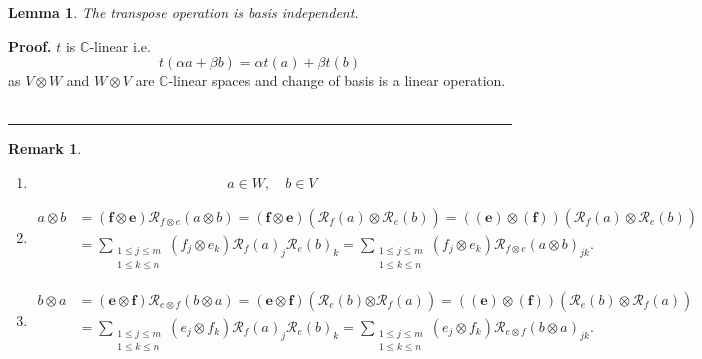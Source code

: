 \documentclass[aps,preprint]{revtex4}%
\newtheorem{lemma}[theorem]{Lemma}
\newtheorem{remark}[theorem]{Remark}
\newenvironment{proof}[1][Proof]{\noindent\textbf{#1.} }{\ \rule{0.5em}{0.5em}}
\begin{document}
\begin{lemma}
The transpose operation is basis independent.
\end{lemma}

\begin{proof}
$t$ is $\mathbb{C}$-linear i.e.
\begin{equation}
t\left(  \alpha a+\beta b\right)  =\alpha t\left(  a\right)  +\beta t\left(
b\right)
\end{equation}
as $V\otimes W$ and $W\otimes V$ are $\mathbb{C}$-linear spaces and change of
basis is a linear operation.
\end{proof}

\begin{remark}
\begin{enumerate}
\item
\begin{equation}
a\in W,\quad b\in V
\end{equation}


\item
\begin{align}
a\otimes b  &  =\left(  \boldsymbol{f}\otimes\boldsymbol{e}\right)
\mathcal{R}_{f\otimes e}\left(  a\otimes b\right)  =\left(  \boldsymbol{f}%
\otimes\boldsymbol{e}\right)  \left(  \overset{}{\mathcal{R}_{f}\left(
a\right)  \otimes\mathcal{R}_{e}\left(  b\right)  }\right)  =\left(  \left(
\boldsymbol{e}\right)  \otimes\left(  \boldsymbol{f}\right)  \right)  \left(
\overset{}{\mathcal{R}_{f}\left(  a\right)  \otimes\mathcal{R}_{e}\left(
b\right)  }\right) \\
&  =\sum_{\substack{1\leq j\leq m\\1\leq k\leq n}}\left(  f_{j}\otimes
e_{k}\right)  \mathcal{R}_{f}\left(  a\right)  _{j}\mathcal{R}_{e}\left(
b\right)  _{k}=\sum_{\substack{1\leq j\leq m\\1\leq k\leq n}}\left(
f_{j}\otimes e_{k}\right)  \mathcal{R}_{f\otimes e}\left(  a\otimes b\right)
_{jk}.
\end{align}


\item
\begin{align}
b\otimes a  &  =\left(  \boldsymbol{e}\otimes\boldsymbol{f}\right)
\mathcal{R}_{e\otimes f}\left(  b\otimes a\right)  =\left(  \boldsymbol{e}%
\otimes\boldsymbol{f}\right)  \left(  \mathcal{R}_{e}\left(  b\right)
\overset{}{\otimes\mathcal{R}_{f}\left(  a\right)  }\right)  =\left(  \left(
\boldsymbol{e}\right)  \otimes\left(  \boldsymbol{f}\right)  \right)  \left(
\overset{}{\mathcal{R}_{e}\left(  b\right)  \otimes\mathcal{R}_{f}\left(
a\right)  }\right) \\
&  =\sum_{\substack{1\leq j\leq m\\1\leq k\leq n}}\left(  e_{j}\otimes
f_{k}\right)  \mathcal{R}_{f}\left(  a\right)  _{j}\mathcal{R}_{e}\left(
b\right)  _{k}=\sum_{\substack{1\leq j\leq m\\1\leq k\leq n}}\left(
e_{j}\otimes f_{k}\right)  \mathcal{R}_{e\otimes f}\left(  b\otimes a\right)
_{jk}.
\end{align}



\end{enumerate}
\end{remark}
\end{document}
